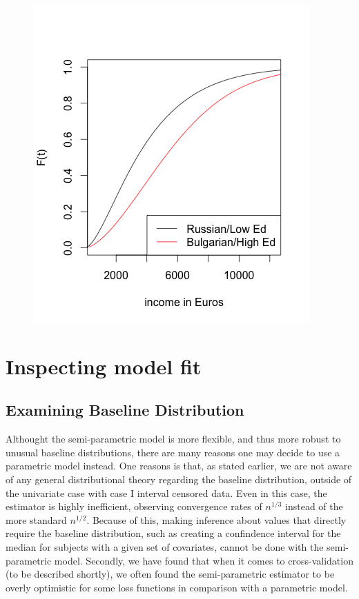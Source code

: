 \documentclass[11pt]{report}
\begin{document}
  \begin{figure}
  \includegraphics{essIncCDF_par.png}
  \label{figure:RusvBulg_par}
  \end{figure}

\chapter{Inspecting model fit}

  \section{Examining Baseline Distribution}
  
  Althought the semi-parametric model is more flexible, and thus more robust to unusual 
  baseline distributions, there are many reasons one may decide to use a parametric model
  instead. One reasons is that, as stated earlier, we are not aware of any general distributional
  theory regarding the baseline distribution, outside of the univariate case with case I 
  interval censored data. Even in this case, the estimator is highly inefficient, observing
  convergence rates of $n^{1/3}$ instead of the more standard $n^{1/2}$. Because of this,
  making inference about values that directly require the baseline distribution, such
  as creating a confindence interval for the median for subjects with a given set of 
  covariates, cannot be done with the semi-parametric model. Secondly, we have found that
  when it comes to cross-validation (to be described shortly), 
  we often found the semi-parametric estimator
  to be overly optimistic for some loss functions in comparison with a parametric model. 
  
\end{document}
